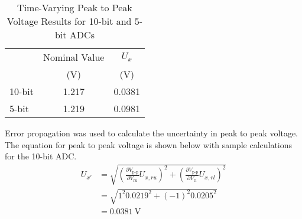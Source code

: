 \begin{table}[h]
   \centering
   \caption{Time-Varying Peak to Peak Voltage Results for 10-bit and 5-bit ADCs}
   \label{tab:time-varying-peak-to-peak-voltage-results}
   \begin{tabular}{lcc}
   \toprule
   & Nominal Value & $U_x$ \\
   & (V)           & (V)   \\
   \midrule
   10-bit & 1.217 & 0.0381  \\
   5-bit  & 1.219 & 0.0981   \\
   \bottomrule
   \end{tabular}
\end{table}
\FloatBarrier
\noindent Error propagation was used to calculate the uncertainty in peak to peak voltage. The equation for peak to peak voltage is shown below with 
sample calculations for the 10-bit ADC.
\[
\begin{aligned}
   U_{x'} &= \sqrt{\left(\frac{\partial V_{\text{p-p}}}{\partial V_{\text{ru}}} U_{x, ru}\right)^2 + \left(\frac{\partial V_{\text{p-p}}}{\partial V_{\text{rl}}} U_{x, rl}\right)^2} \\
          &= \sqrt{1^2 0.0219^2 + (-1)^2 0.0205^2} \\
            &= \boxed{\qty{0.0381}{\volt}}
\end{aligned}
\]





